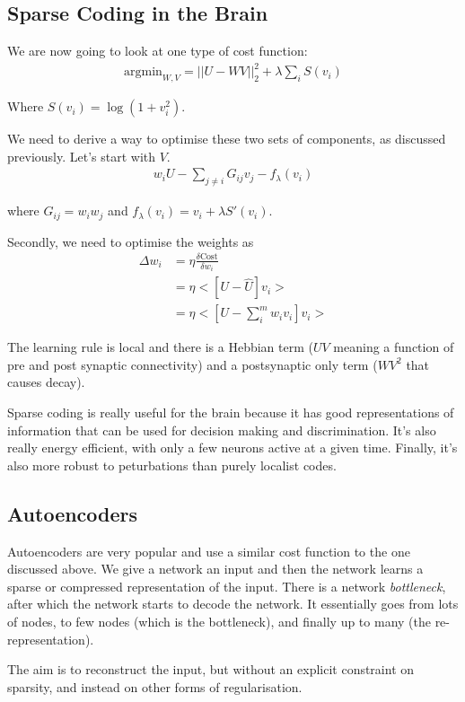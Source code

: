 \documentclass[11pt,a4paper,titlepage,dvipsnames,cmyk]{scrartcl}
\begin{document}
\subsection{Sparse Coding in the Brain}
We are now going to look at one type of cost function:
\begin{align*}
\text{argmin}_{W,V} = ||U-WV||^2_2 + \lambda \sum_{i}S(v_i)
\end{align*}

Where $S(v_i) = \log(1+v_i^2)$.

We need to derive a way to optimise these two sets of components, as discussed previously. Let's start with $V$.
\begin{align*}
w_iU - \sum_{j \not = i} G_{ij}v_j - f_\lambda(v_i)
\end{align*}

where $G_{ij} = w_i w_j$ and $f_\lambda(v_i) = v_i + \lambda S'(v_i)$.

Secondly, we need to optimise the weights as
\begin{align*}
\Delta w_i &= \eta \frac{\delta \text{Cost}}{\delta w_i} \\
&= \eta < [U- \hat U]v_i > \\
&= \eta < [U - \sum_{i}^{m}w_iv_i]v_i >
\end{align*}

The learning rule is local and there is a Hebbian term ($UV$ meaning a function of pre and post synaptic connectivity) and a postsynaptic only term ($WV^2$ that causes decay).

Sparse coding is really useful for the brain because it has good representations of information that can be used for decision making and discrimination. It's also really energy efficient, with only a few neurons active at a given time. Finally, it's also more robust to peturbations than purely localist codes.

\subsection{Autoencoders}
Autoencoders are very popular and use a similar cost function to the one discussed above. We give a network an input and then the network learns a sparse or compressed representation of the input. There is a network \textit{bottleneck}, after which the network starts to decode the network. It essentially goes from lots of nodes, to few nodes (which is the bottleneck), and finally up to many (the re-representation).

The aim is to reconstruct the input, but without an explicit constraint on sparsity, and instead on other forms of regularisation.
\end{document}
